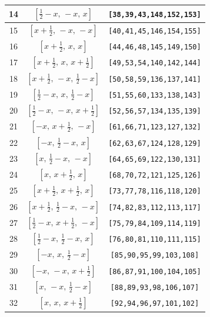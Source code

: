 \documentclass[fleqn,8pt]{jsarticle}
\begin{document}
\begin{longtable}{ccc}
14 & $\left[ \frac{1}{2} - x,\, - x,\, x \right]$ & {\tt [38,39,43,148,152,153]} \\ \hline
15 & $\left[ x + \frac{1}{2},\, - x,\, - x \right]$ & {\tt [40,41,45,146,154,155]} \\ \hline
16 & $\left[ x + \frac{1}{2},\, x,\, x \right]$ & {\tt [44,46,48,145,149,150]} \\ \hline
17 & $\left[ x + \frac{1}{2},\, x,\, x + \frac{1}{2} \right]$ & {\tt [49,53,54,140,142,144]} \\ \hline
18 & $\left[ x + \frac{1}{2},\, - x,\, \frac{1}{2} - x \right]$ & {\tt [50,58,59,136,137,141]} \\ \hline
19 & $\left[ \frac{1}{2} - x,\, x,\, \frac{1}{2} - x \right]$ & {\tt [51,55,60,133,138,143]} \\ \hline
20 & $\left[ \frac{1}{2} - x,\, - x,\, x + \frac{1}{2} \right]$ & {\tt [52,56,57,134,135,139]} \\ \hline
21 & $\left[ - x,\, x + \frac{1}{2},\, - x \right]$ & {\tt [61,66,71,123,127,132]} \\ \hline
22 & $\left[ - x,\, \frac{1}{2} - x,\, x \right]$ & {\tt [62,63,67,124,128,129]} \\ \hline
23 & $\left[ x,\, \frac{1}{2} - x,\, - x \right]$ & {\tt [64,65,69,122,130,131]} \\ \hline
24 & $\left[ x,\, x + \frac{1}{2},\, x \right]$ & {\tt [68,70,72,121,125,126]} \\ \hline
25 & $\left[ x + \frac{1}{2},\, x + \frac{1}{2},\, x \right]$ & {\tt [73,77,78,116,118,120]} \\ \hline
26 & $\left[ x + \frac{1}{2},\, \frac{1}{2} - x,\, - x \right]$ & {\tt [74,82,83,112,113,117]} \\ \hline
27 & $\left[ \frac{1}{2} - x,\, x + \frac{1}{2},\, - x \right]$ & {\tt [75,79,84,109,114,119]} \\ \hline
28 & $\left[ \frac{1}{2} - x,\, \frac{1}{2} - x,\, x \right]$ & {\tt [76,80,81,110,111,115]} \\ \hline
29 & $\left[ - x,\, x,\, \frac{1}{2} - x \right]$ & {\tt [85,90,95,99,103,108]} \\ \hline
30 & $\left[ - x,\, - x,\, x + \frac{1}{2} \right]$ & {\tt [86,87,91,100,104,105]} \\ \hline
31 & $\left[ x,\, - x,\, \frac{1}{2} - x \right]$ & {\tt [88,89,93,98,106,107]} \\ \hline
32 & $\left[ x,\, x,\, x + \frac{1}{2} \right]$ & {\tt [92,94,96,97,101,102]} \\
\end{longtable}
\end{document}
